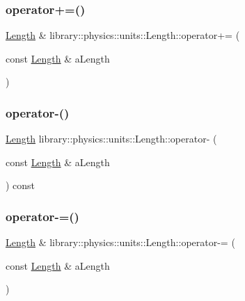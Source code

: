 \mbox{\label{classlibrary_1_1physics_1_1units_1_1_length_ac3a51c8bd2a7c6f9ef39a3444d0bc3dc}} 
\subsubsection{\texorpdfstring{operator+=()}{operator+=()}}
{\footnotesize\ttfamily \hyperlink{classlibrary_1_1physics_1_1units_1_1_length}{Length} \& library\+::physics\+::units\+::\+Length\+::operator+= (\begin{DoxyParamCaption}\item[{const \hyperlink{classlibrary_1_1physics_1_1units_1_1_length}{Length} \&}]{a\+Length }\end{DoxyParamCaption})}

\mbox{\label{classlibrary_1_1physics_1_1units_1_1_length_af34113f000f221058dc48df951c0c861}} 
\subsubsection{\texorpdfstring{operator-\/()}{operator-()}}
{\footnotesize\ttfamily \hyperlink{classlibrary_1_1physics_1_1units_1_1_length}{Length} library\+::physics\+::units\+::\+Length\+::operator-\/ (\begin{DoxyParamCaption}\item[{const \hyperlink{classlibrary_1_1physics_1_1units_1_1_length}{Length} \&}]{a\+Length }\end{DoxyParamCaption}) const}

\mbox{\label{classlibrary_1_1physics_1_1units_1_1_length_a5b02e27f94eea5c5b2b4c7a8e36ab243}} 
\subsubsection{\texorpdfstring{operator-\/=()}{operator-=()}}
{\footnotesize\ttfamily \hyperlink{classlibrary_1_1physics_1_1units_1_1_length}{Length} \& library\+::physics\+::units\+::\+Length\+::operator-\/= (\begin{DoxyParamCaption}\item[{const \hyperlink{classlibrary_1_1physics_1_1units_1_1_length}{Length} \&}]{a\+Length }\end{DoxyParamCaption})}

